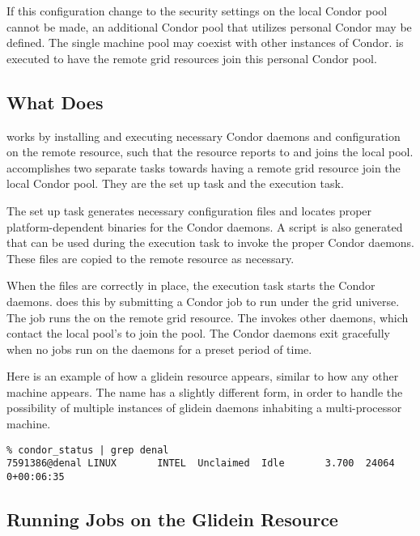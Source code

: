 If this configuration change to the security settings on
the local Condor pool cannot be made,
an additional Condor pool that utilizes
personal Condor may be defined.
The single machine pool
may coexist with other instances of Condor.
 is executed to have the remote grid
resources join this personal Condor pool.

\subsection{What  Does}

 works by installing and executing
necessary Condor daemons and configuration on the remote resource,
such that the resource reports to and joins the local pool.
 accomplishes two separate tasks towards
having a remote grid resource join the local Condor pool.
They are the set up task and the execution task.

The set up task generates necessary 
configuration files and locates proper platform-dependent
binaries for the Condor daemons.
A script is also generated that can be used during
the execution task to invoke the proper Condor daemons.
These files are copied to the remote resource as necessary.

When the files are correctly in place,
the execution task starts the Condor daemons.
 does this by submitting a Condor job
to run under the grid universe.
The job runs the  on the remote grid resource.
The  invokes other daemons, which contact
the local pool's  to join the pool.
The Condor daemons exit gracefully when no jobs run on the daemons for a
preset period of time.

Here is an example of how a glidein resource appears, similar to how
any other machine appears.  The name has a
slightly different form, in order to handle the possibility of
multiple instances of glidein daemons inhabiting a multi-processor
machine.

\footnotesize
\begin{verbatim}
% condor_status | grep denal
7591386@denal LINUX       INTEL  Unclaimed  Idle       3.700  24064  0+00:06:35

\end{verbatim}
\normalsize

\subsection{Running Jobs on the Glidein Resource}

